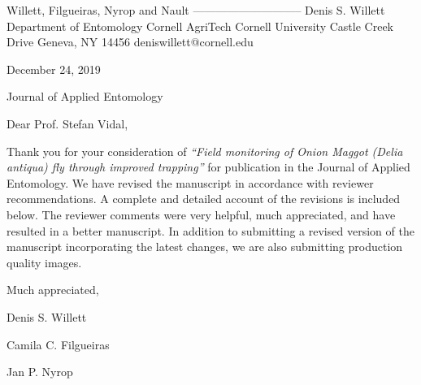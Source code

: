 \documentclass{article}
\begin{document}
\begin{addmargin}[3.8in]{}
Willett, Filgueiras, \newline
Nyrop and Nault \newline
----------------------------- \newline
Denis S. Willett\newline
Department of Entomology \newline
Cornell AgriTech  \newline
Cornell University  Castle Creek Drive \newline
Geneva, NY 14456 \newline
deniswillett@cornell.edu \newline
\end{addmargin}
\setlength{\parindent}{0cm}

December 24, 2019

\vspace{1.24em}

Journal of Applied Entomology 

\vspace{1.24em}

Dear Prof. Stefan Vidal,

\vspace{0.48em}
\setlength{\parindent}{1.24cm}

Thank you for your consideration of \textit{“Field monitoring of Onion Maggot (\textit{Delia antiqua}) fly through improved trapping”} for publication in the Journal of Applied Entomology.  We have revised the manuscript in accordance with reviewer recommendations.  A complete and detailed account of the revisions is included below.  The reviewer comments were very helpful, much appreciated, and have resulted in a better manuscript.  In addition to submitting a revised version of the manuscript incorporating the latest changes, we are also submitting production quality images.  
  

\vspace{2em}

Much appreciated, \newline

\vspace{1em}

Denis S. Willett
\vspace{0.48em}

Camila C. Filgueiras
\vspace{0.48em}

Jan P. Nyrop
\vspace{0.48em}
\end{document}
